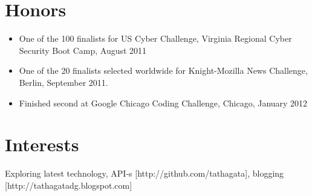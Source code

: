 \documentclass[a4paper, oneside, final]{scrartcl}
\begin{document}
\begin{center}
\section{Honors}
\begin{itemize}
\small\sffamily{}
\item One of the 100 finalists for US Cyber Challenge, Virginia Regional Cyber Security Boot Camp, August 2011
\vspace{-0.3cm}
\item One of the 20 finalists selected worldwide for Knight-Mozilla News Challenge, Berlin, September 2011.
\vspace{-0.3cm}
\item Finished second at Google Chicago Coding Challenge, Chicago, January 2012
\end{itemize} 

\section{Interests}
\small\sffamily{}
Exploring latest technology, API-s [http://github.com/tathagata], blogging [http://tathagatadg.blogspot.com]





\end{center}
\end{document}
